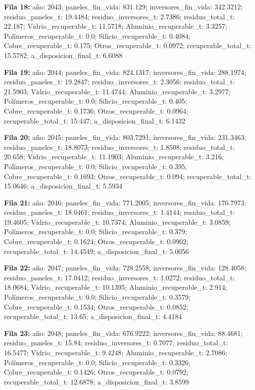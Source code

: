 {\footnotesize\textbf{Fila 18:} año: 2043; paneles\_fin\_vida: 831.129; inversores\_fin\_vida: 342.3212; residuo\_paneles\_t: 19.4484; residuo\_inversores\_t: 2.7386; residuo\_total\_t: 22.187; Vidrio\_recuperable\_t: 11.5718; Aluminio\_recuperable\_t: 3.3257; Polímeros\_recuperable\_t: 0.0; Silicio\_recuperable\_t: 0.4084; Cobre\_recuperable\_t: 0.175; Otros\_recuperable\_t: 0.0972; recuperable\_total\_t: 15.5782; a\_disposicion\_final\_t: 6.6088\par}
{\footnotesize\textbf{Fila 19:} año: 2044; paneles\_fin\_vida: 824.1317; inversores\_fin\_vida: 288.1974; residuo\_paneles\_t: 19.2847; residuo\_inversores\_t: 2.3056; residuo\_total\_t: 21.5903; Vidrio\_recuperable\_t: 11.4744; Aluminio\_recuperable\_t: 3.2977; Polímeros\_recuperable\_t: 0.0; Silicio\_recuperable\_t: 0.405; Cobre\_recuperable\_t: 0.1736; Otros\_recuperable\_t: 0.0964; recuperable\_total\_t: 15.447; a\_disposicion\_final\_t: 6.1432\par}
{\footnotesize\textbf{Fila 20:} año: 2045; paneles\_fin\_vida: 803.7291; inversores\_fin\_vida: 231.3463; residuo\_paneles\_t: 18.8073; residuo\_inversores\_t: 1.8508; residuo\_total\_t: 20.658; Vidrio\_recuperable\_t: 11.1903; Aluminio\_recuperable\_t: 3.216; Polímeros\_recuperable\_t: 0.0; Silicio\_recuperable\_t: 0.395; Cobre\_recuperable\_t: 0.1693; Otros\_recuperable\_t: 0.094; recuperable\_total\_t: 15.0646; a\_disposicion\_final\_t: 5.5934\par}
{\footnotesize\textbf{Fila 21:} año: 2046; paneles\_fin\_vida: 771.2005; inversores\_fin\_vida: 176.7973; residuo\_paneles\_t: 18.0461; residuo\_inversores\_t: 1.4144; residuo\_total\_t: 19.4605; Vidrio\_recuperable\_t: 10.7374; Aluminio\_recuperable\_t: 3.0859; Polímeros\_recuperable\_t: 0.0; Silicio\_recuperable\_t: 0.379; Cobre\_recuperable\_t: 0.1624; Otros\_recuperable\_t: 0.0902; recuperable\_total\_t: 14.4549; a\_disposicion\_final\_t: 5.0056\par}
{\footnotesize\textbf{Fila 22:} año: 2047; paneles\_fin\_vida: 728.2558; inversores\_fin\_vida: 128.4058; residuo\_paneles\_t: 17.0412; residuo\_inversores\_t: 1.0272; residuo\_total\_t: 18.0684; Vidrio\_recuperable\_t: 10.1395; Aluminio\_recuperable\_t: 2.914; Polímeros\_recuperable\_t: 0.0; Silicio\_recuperable\_t: 0.3579; Cobre\_recuperable\_t: 0.1534; Otros\_recuperable\_t: 0.0852; recuperable\_total\_t: 13.65; a\_disposicion\_final\_t: 4.4184\par}
{\footnotesize\textbf{Fila 23:} año: 2048; paneles\_fin\_vida: 676.9222; inversores\_fin\_vida: 88.4681; residuo\_paneles\_t: 15.84; residuo\_inversores\_t: 0.7077; residuo\_total\_t: 16.5477; Vidrio\_recuperable\_t: 9.4248; Aluminio\_recuperable\_t: 2.7086; Polímeros\_recuperable\_t: 0.0; Silicio\_recuperable\_t: 0.3326; Cobre\_recuperable\_t: 0.1426; Otros\_recuperable\_t: 0.0792; recuperable\_total\_t: 12.6878; a\_disposicion\_final\_t: 3.8599\par}

